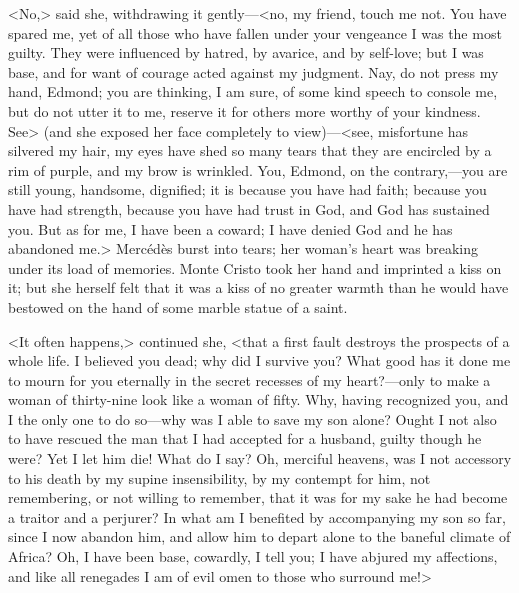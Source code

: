  <No,> said she, withdrawing it gently—<no, my friend, touch me not. You have spared me, yet of all those who have fallen under your vengeance I was the most guilty. They were influenced by hatred, by avarice, and by self-love; but I was base, and for want of courage acted against my judgment. Nay, do not press my hand, Edmond; you are thinking, I am sure, of some kind speech to console me, but do not utter it to me, reserve it for others more worthy of your kindness. See> (and she exposed her face completely to view)—<see, misfortune has silvered my hair, my eyes have shed so many tears that they are encircled by a rim of purple, and my brow is wrinkled. You, Edmond, on the contrary,—you are still young, handsome, dignified; it is because you have had faith; because you have had strength, because you have had trust in God, and God has sustained you. But as for me, I have been a coward; I have denied God and he has abandoned me.>  Mercédès burst into tears; her woman's heart was breaking under its load of memories. Monte Cristo took her hand and imprinted a kiss on it; but she herself felt that it was a kiss of no greater warmth than he would have bestowed on the hand of some marble statue of a saint. 

 <It often happens,> continued she, <that a first fault destroys the prospects of a whole life. I believed you dead; why did I survive you? What good has it done me to mourn for you eternally in the secret recesses of my heart?—only to make a woman of thirty-nine look like a woman of fifty. Why, having recognized you, and I the only one to do so—why was I able to save my son alone? Ought I not also to have rescued the man that I had accepted for a husband, guilty though he were? Yet I let him die! What do I say? Oh, merciful heavens, was I not accessory to his death by my supine insensibility, by my contempt for him, not remembering, or not willing to remember, that it was for my sake he had become a traitor and a perjurer? In what am I benefited by accompanying my son so far, since I now abandon him, and allow him to depart alone to the baneful climate of Africa? Oh, I have been base, cowardly, I tell you; I have abjured my affections, and like all renegades I am of evil omen to those who surround me!> 

